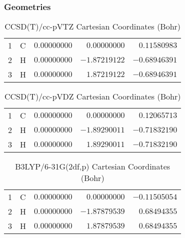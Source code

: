 \documentclass[10pt,oneside]{article}
\begin{document}
\subsubsection*{Geometries}
\begin{table}[h!]
\centering
\caption{CCSD(T)/cc-pVTZ Cartesian Coordinates (Bohr)}
\begin{tabular}{llrrr}
1  & C  & $ 0.00000000$ & $ 0.00000000$ & $ 0.11580983$ \\
2  & H  & $ 0.00000000$ & $-1.87219122$ & $-0.68946391$ \\
3  & H  & $ 0.00000000$ & $ 1.87219122$ & $-0.68946391$ \\
\end{tabular}
\end{table}

\begin{table}[h!]
\centering
\caption{CCSD(T)/cc-pVDZ Cartesian Coordinates (Bohr)}
\begin{tabular}{llrrr}
1  & C  & $ 0.00000000$ & $ 0.00000000$ & $ 0.12065713$ \\
2  & H  & $ 0.00000000$ & $-1.89290011$ & $-0.71832190$ \\
3  & H  & $ 0.00000000$ & $ 1.89290011$ & $-0.71832190$ \\
\end{tabular}
\end{table}

\begin{table}[h!]
\centering
\caption{B3LYP/6-31G(2df,p) Cartesian Coordinates (Bohr)}
\begin{tabular}{llrrr}
1  & C  & $ 0.00000000$ & $ 0.00000000$ & $-0.11505054$ \\
2  & H  & $ 0.00000000$ & $-1.87879539$ & $ 0.68494355$ \\
3  & H  & $ 0.00000000$ & $ 1.87879539$ & $ 0.68494355$ \\
\end{tabular}
\end{table}

\clearpage
\end{document}
